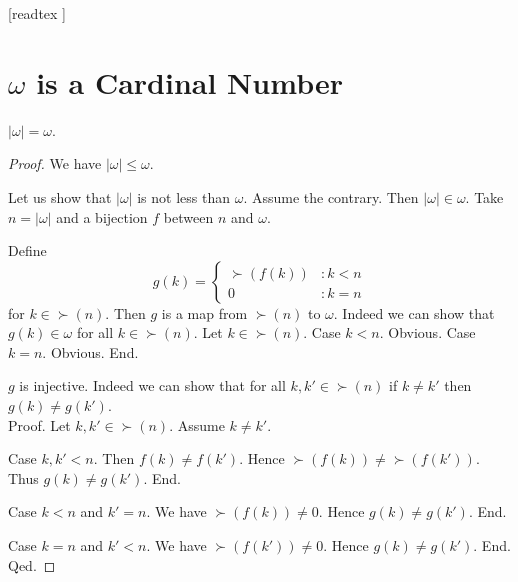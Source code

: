 \documentclass[10pt]{article}
\begin{document}
  \begin{imports}
    \begin{forthel}
      [readtex ]
    \end{forthel}
  \end{imports}


  \section*{$\omega$ is a Cardinal Number}

  \begin{forthel}
    \begin{proposition}[id=SET_THEORY_07_4952029518626816,printid]
      $|\omega| = \omega$.
    \end{proposition}
    \begin{proof}
      We have $|\omega| \leq \omega$.

      Let us show that $|\omega|$ is not less than $\omega$.
        Assume the contrary.
        Then $|\omega| \in \omega$.
        Take $n = |\omega|$ and a bijection $f$ between $n$ and $\omega$.

        Define \[ g(k) =
          \begin{cases}
            \succ(f(k)) & : k < n
            \\
            0           & : k = n
          \end{cases} \]
        for $k \in \succ(n)$.
        Then $g$ is a map from $\succ(n)$ to $\omega$.
        Indeed we can show that $g(k) \in \omega$ for all $k \in \succ(n)$.
          Let $k \in \succ(n)$.
          Case $k < n$. Obvious.
          Case $k = n$. Obvious.
        End.

        $g$ is injective.
        Indeed we can show that for all $k, k' \in \succ(n)$ if $k \neq k'$
        then $g(k) \neq g(k')$. \\
        Proof.
          Let $k, k' \in \succ(n)$.
          Assume $k \neq k'$.

          Case $k, k' < n$.
            Then $f(k) \neq f(k')$.
            Hence $\succ(f(k)) \neq \succ(f(k'))$.
            Thus $g(k) \neq g(k')$.
          End.

          Case $k < n$ and $k' = n$.
            We have $\succ(f(k)) \neq 0$.
            Hence $g(k) \neq g(k')$.
          End.

          Case $k = n$ and $k' < n$.
            We have $\succ(f(k')) \neq 0$.
            Hence $g(k) \neq g(k')$.
          End.
        Qed.


\end{proof}
\end{forthel}
\end{document}
